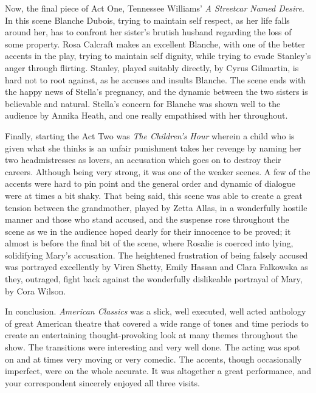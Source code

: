Now, the final piece of Act One, Tennessee Williams' \textit{A Streetcar
	Named Desire}. In this scene Blanche Dubois, trying to maintain self
respect, as her life falls around her, has to confront her sister's
brutish husband regarding the loss of some property. Rosa Calcraft makes
an excellent Blanche, with one of the better accents in the play, trying
to maintain self dignity, while trying to evade Stanley's anger through
flirting. Stanley, played suitably directly, by Cyrus Gilmartin, is hard
not to root against, as he accuses and insults Blanche. The scene ends
with the happy news of Stella's pregnancy, and the dynamic between the
two sisters is believable and natural. Stella's concern for Blanche was
shown well to the audience by Annika Heath, and one really empathised
with her throughout.

Finally, starting the Act Two was \textit{The Children's Hour} wherein a
child who is given what she thinks is an unfair punishment takes her
revenge by naming her two headmistresses as lovers, an accusation which
goes on to destroy their careers. Although being very strong, it was one
of the weaker scenes. A few of the accents were hard to pin point and
the general order and dynamic of dialogue were at times a bit shaky.
That being said, this scene was able to create a great tension between
the grandmother, played by Zetta Allas, in a wonderfully hostile manner
and those who stand accused, and the suspense rose throughout the scene
as we in the audience hoped dearly for their innocence to be proved; it
almost is before the final bit of the scene, where Rosalie is coerced
into lying, solidifying Mary's accusation. The heightened frustration of
being falsely accused was portrayed excellently by Viren Shetty, Emily
Hassan and Clara Falkowska as they, outraged, fight back against the
wonderfully dislikeable portrayal of Mary, by Cora Wilson.

In conclusion. \textit{American Classics} was a slick, well executed, well
acted anthology of great American theatre that covered a wide range of
tones and time periods to create an entertaining thought-provoking look
at many themes throughout the show. The transitions were interesting and
very well done. The acting was spot on and at times very moving or very
comedic. The accents, though occasionally imperfect, were on the whole
accurate. It was altogether a great performance, and your correspondent
sincerely enjoyed all three visits.
